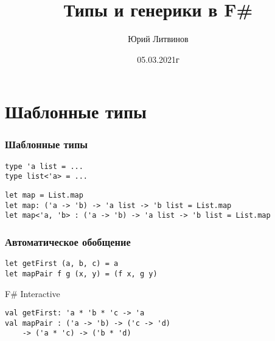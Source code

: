 \documentclass[xetex,mathserif,serif]{beamer}
\title{Типы и генерики в F\#}
\author{Юрий Литвинов}
\date{05.03.2021г}
\begin{document}
    \frame{\titlepage}

    \section{Шаблонные типы}
    
    \begin{frame}[fragile]
        \frametitle{Шаблонные типы}
        \begin{verbatim}
type 'a list = ...
type list<'a> = ...
        \end{verbatim}

        \begin{verbatim}
let map = List.map
let map: ('a -> 'b) -> 'a list -> 'b list = List.map
let map<'a, 'b> : ('a -> 'b) -> 'a list -> 'b list = List.map
        \end{verbatim}
    \end{frame}

    \begin{frame}[fragile]
        \frametitle{Автоматическое обобщение}
        \begin{verbatim}
let getFirst (a, b, c) = a
let mapPair f g (x, y) = (f x, g y)
        \end{verbatim}

        \begin{alertblock}{F\# Interactive}
            \begin{verbatim}
val getFirst: 'a * 'b * 'c -> 'a
val mapPair : ('a -> 'b) -> ('c -> 'd) 
    -> ('a * 'c) -> ('b * 'd)
            \end{verbatim}
        \end{alertblock}
    \end{frame}
\end{document}
